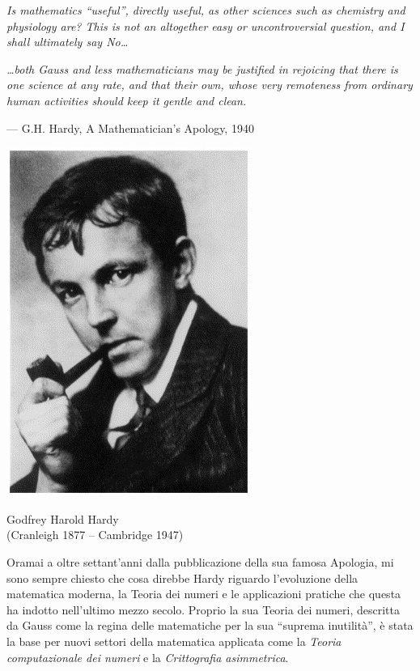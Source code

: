 \documentclass[twoside,symmetric,justified,openany,nobib]{tufte-book}
\begin{document}
\begin{displayquote}
  \textit{Is mathematics ``useful'', directly useful, as other sciences such as
  chemistry and physiology are? This is not an altogether easy or
  uncontroversial question, and I shall ultimately say No\dots}

  \textit{\dots both Gauss and less mathematicians may be justified in rejoicing
  that there is one science at any rate, and that their own, whose very remoteness
  from ordinary human activities should keep it gentle and clean.}

  \raggedleft
  --- G.H. Hardy, A Mathematician's Apology, 1940
\end{displayquote}

\vspace*{0.75cm}
\begin{marginfigure}
  \vspace*{-0.3cm}
  \includegraphics{hardy_pipe.jpg}
  \begin{center}Godfrey Harold Hardy\\ (Cranleigh 1877 -- Cambridge 1947)\end{center}
  \label{fig:marginfig}
\end{marginfigure}

\vspace*{-0.75cm}
\bigskip
\noindent
Oramai a oltre settant'anni dalla pubblicazione della sua famosa Apologia, mi sono
sempre chiesto che cosa direbbe Hardy riguardo l'evoluzione della matematica moderna,
la Teoria dei numeri e le applicazioni pratiche che questa ha indotto nell'ultimo mezzo secolo.
Proprio la sua Teoria dei numeri, descritta da Gauss come la regina delle matematiche per la sua ``suprema inutilità'',
è stata la base per nuovi settori della matematica applicata come la \textit{Teoria computazionale dei numeri}
e la \textit{Crittografia asimmetrica}.
\end{document}
